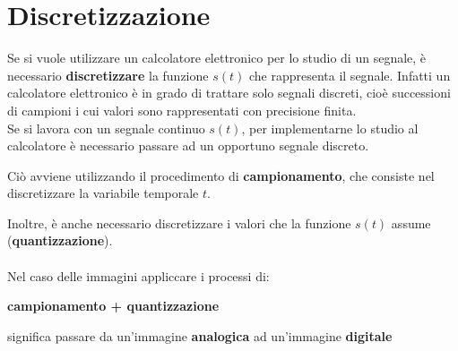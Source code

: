 \section{Discretizzazione}
Se si vuole utilizzare un calcolatore elettronico per lo studio di un
segnale, è necessario \textbf{discretizzare} la funzione $s(t)$ che rappresenta
il segnale. Infatti un calcolatore elettronico è in grado di trattare
solo segnali discreti, cioè successioni di campioni i cui valori sono
rappresentati con precisione finita.
\\Se si lavora con un segnale continuo $s(t)$, per implementarne lo
studio al calcolatore è necessario passare ad un opportuno segnale
discreto.
\begin{center}
    Ciò avviene utilizzando il procedimento di \textbf{campionamento}, che consiste nel discretizzare la variabile temporale $t$.
\end{center}
Inoltre, è anche necessario discretizzare i valori che la funzione $s(t)$
assume (\textbf{quantizzazione}).
\\\\Nel caso delle immagini appliccare i processi di:
\begin{center}
    \textbf{campionamento + quantizzazione}
\end{center}
significa passare da un'immagine \textbf{analogica} ad un'immagine \textbf{digitale}